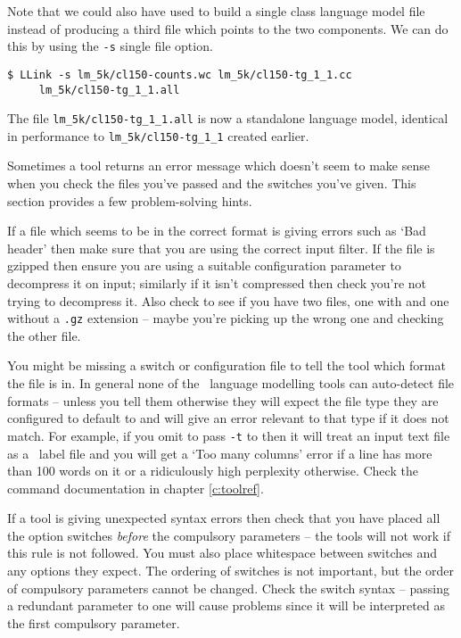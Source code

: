 Note that we could also have used  to build a single
class language model file instead of producing a third file which
points to the two components.  We can do this by using the {\tt -s}
single file option.
\begin{verbatim}
$ LLink -s lm_5k/cl150-counts.wc lm_5k/cl150-tg_1_1.cc
     lm_5k/cl150-tg_1_1.all
\end{verbatim} %
The file {\tt lm\_5k/cl150-tg\_1\_1.all} is now a standalone language
model, identical in performance to {\tt lm\_5k/cl150-tg\_1\_1} created
earlier.


Sometimes a tool returns an error message which doesn't seem to make
sense when you check the files you've passed and the switches
you've given.  This section provides a few problem-solving hints.

If a file which seems to be in the correct format is giving errors
such as `Bad header' then make sure that you are using the correct
input filter.  If the file is gzipped then ensure you are using a
suitable configuration parameter to decompress it on input; similarly
if it isn't compressed then check you're not trying to decompress it.
Also check to see if you have two files, one with and one without a
{\tt .gz} extension -- maybe you're picking up the wrong one and
checking the other file.

You might be missing a switch or configuration file to tell the tool
which format the file is in.  In general none of the \HTK\ language
modelling tools can auto-detect file formats -- unless you tell them
otherwise they will expect the file type they are configured to
default to and will give an error relevant to that type if it does not
match.  For example, if you omit to pass {\tt -t} to 
then it will treat an input text file as a
\HTK\ label file and you will get a `Too many columns' error if a line
has more than 100 words on it or a ridiculously high perplexity
otherwise.  Check the command documentation in chapter
\ref{c:toolref}.

If a tool is giving unexpected syntax errors then check that you have
placed all the option switches {\it before} the compulsory parameters
-- the tools will not work if this rule is not followed.  You must
also place whitespace between switches and any options they expect.
The ordering of switches is not important, but the order of compulsory
parameters cannot be changed.  Check the switch syntax -- passing a
redundant parameter to one will cause problems since it will be
interpreted as the first compulsory parameter.

